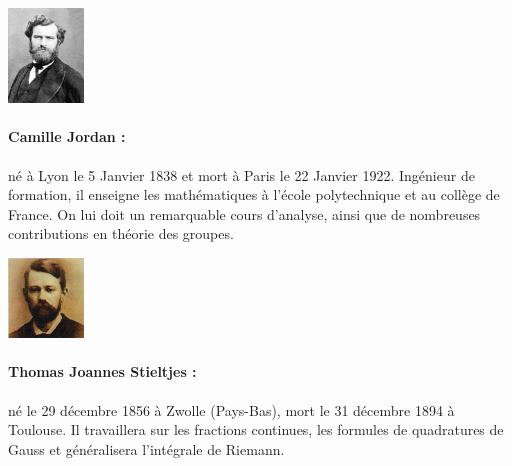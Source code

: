 \begin{minipage}{0.2\linewidth}
\begin{center}\includegraphics[width=2cm]{images/Jordan.jpg}\end{center}
\end{minipage}
\begin{minipage}{0.80\linewidth}
\small{\paragraph*{Camille Jordan :} né à Lyon le 5 Janvier 1838 et mort à Paris le 22 Janvier 1922. Ingénieur de formation, il enseigne les mathématiques à l'école polytechnique et au collège de France. On lui doit un remarquable cours d'analyse, ainsi que de nombreuses contributions en théorie des groupes.}
\end{minipage}
\vfill


\begin{minipage}{0.2\linewidth}
\begin{center}\includegraphics[width=2cm]{images/Stieltjes.jpg}\end{center}
\end{minipage}
\begin{minipage}{0.80\linewidth}
\small{\paragraph*{Thomas Joannes Stieltjes :} né le 29 décembre 1856 à Zwolle (Pays-Bas), mort le 31 décembre 1894 à Toulouse. Il travaillera sur les fractions continues, les formules de quadratures de Gauss et généralisera l'intégrale de Riemann.}
\end{minipage}

\vfill

